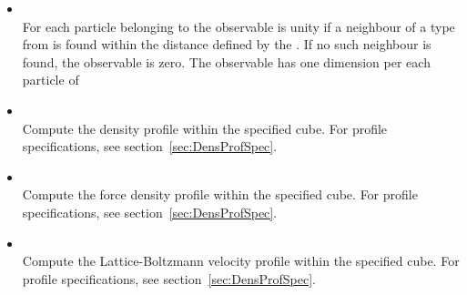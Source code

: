 \begin{itemize}
    \item {}    \\
          For each particle belonging to  
          the observable is unity if a neighbour of a type from 
           is found within the distance 
          defined by the . If no such neighbour is found, the 
          observable is zero. The observable has one dimension per each 
          particle of 
    \item {}    \\
          Compute the density profile within the specified cube.
          For profile specifications, see section~\ref{sec:DensProfSpec}.
\item {}    \\
          Compute the force density profile within the specified cube.
          For profile specifications, see section~\ref{sec:DensProfSpec}.
    \item {}    \\
          Compute the Lattice-Boltzmann velocity profile within the specified cube.
          For profile specifications, see section~\ref{sec:DensProfSpec}.


\end{itemize}
